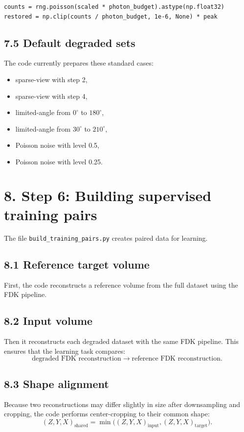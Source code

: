 \documentclass[12pt,a4paper]{article}
\begin{document}
\begin{lstlisting}[style=py,caption={Poisson noise simulation}]
counts = rng.poisson(scaled * photon_budget).astype(np.float32)
restored = np.clip(counts / photon_budget, 1e-6, None) * peak
\end{lstlisting}

\subsection*{7.5 Default degraded sets}
The code currently prepares these standard cases:
\begin{itemize}[leftmargin=*]
\item sparse-view with step 2,
\item sparse-view with step 4,
\item limited-angle from $0^\circ$ to $180^\circ$,
\item limited-angle from $30^\circ$ to $210^\circ$,
\item Poisson noise with level 0.5,
\item Poisson noise with level 0.25.
\end{itemize}

\section*{8. Step 6: Building supervised training pairs}
The file \texttt{build\_training\_pairs.py} creates paired data for learning.

\subsection*{8.1 Reference target volume}
First, the code reconstructs a reference volume from the full dataset using the FDK pipeline.

\subsection*{8.2 Input volume}
Then it reconstructs each degraded dataset with the same FDK pipeline. This ensures that the learning task compares:
\[
\text{degraded FDK reconstruction} \rightarrow \text{reference FDK reconstruction}.
\]

\subsection*{8.3 Shape alignment}
Because two reconstructions may differ slightly in size after downsampling and cropping, the code performs center-cropping to their common shape:
\[
(Z,Y,X)_{\text{shared}} = \min\big((Z,Y,X)_{\text{input}}, (Z,Y,X)_{\text{target}}\big).
\]
\end{document}
